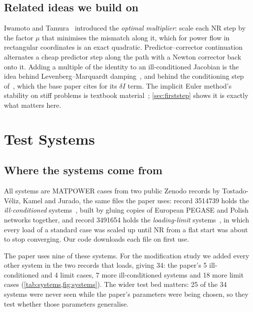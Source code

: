 \documentclass[11pt,a4paper]{article}
\begin{document}
\subsection{Related ideas we build on}
Iwamoto and Tamura~\cite{iwamoto1981} introduced the \emph{optimal multiplier}: scale each NR step by the
factor $\mu$ that minimises the mismatch along it, which for power flow in rectangular coordinates is an
exact quadratic. Predictor--corrector continuation~\cite{allgower2003} alternates a cheap predictor step
along the path with a Newton corrector back onto it. Adding a multiple of the identity to an
ill-conditioned Jacobian is the idea behind Levenberg--Marquardt damping~\cite{levenberg1944,marquardt1963},
and behind the conditioning step of~\cite{freitas2023}, which the base paper cites for its
$\delta I$ term. The implicit Euler method's stability on stiff problems is textbook
material~\cite{hairer1996}; \cref{sec:firststep} shows it is exactly what matters here.

\section{Test Systems}\label{sec:data}

\subsection{Where the systems come from}
All systems are MATPOWER cases from two public Zenodo records by Tostado-V\'eliz, Kamel and Jurado,
the same files the paper uses: record 3514739 holds the \emph{ill-conditioned} systems~\cite{tostado2019ill},
built by gluing copies of European PEGASE and Polish networks together, and record 3491654 holds the
\emph{loading-limit} systems~\cite{tostado2019limit}, in which every load of a standard case was scaled up
until NR from a flat start was about to stop converging. Our code downloads each file on first use.

The paper uses nine of these systems. For the modification study we added every other system in the two
records that loads, giving 34: the paper's 5 ill-conditioned and 4 limit cases, 7 more ill-conditioned
systems and 18 more limit cases (\cref{tab:systems,fig:systems}). The wider test bed matters: 25 of the
34 systems were never seen while the paper's parameters were being chosen, so they test whether those
parameters generalise.
\end{document}
